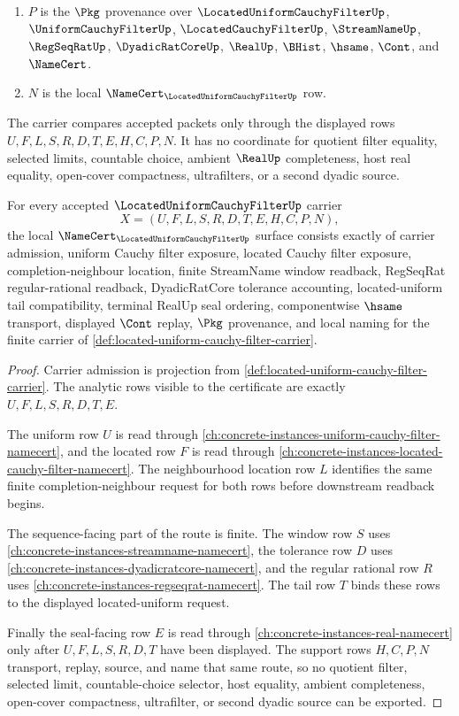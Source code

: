 \begin{definition}
\begin{enumerate}
\item $P$ is the $\Pkg$ provenance over $\LocatedUniformCauchyFilterUp$, $\UniformCauchyFilterUp$, $\LocatedCauchyFilterUp$, $\StreamNameUp$, $\RegSeqRatUp$, $\DyadicRatCoreUp$, $\RealUp$, $\BHist$, $\hsame$, $\Cont$, and $\NameCert$.
\item $N$ is the local $\NameCert_{\LocatedUniformCauchyFilterUp}$ row.
\end{enumerate}
The carrier compares accepted packets only through the displayed rows $U,F,L,S,R,D,T,E,H,C,P,N$. It has no coordinate for quotient filter equality, selected limits, countable choice, ambient $\RealUp$ completeness, host real equality, open-cover compactness, ultrafilters, or a second dyadic source.
\end{definition}

\begin{theorem}
\label{thm:located-uniform-cauchy-filter-obligations}
For every accepted $\LocatedUniformCauchyFilterUp$ carrier
$$
X=(U,F,L,S,R,D,T,E,H,C,P,N),
$$
the local $\NameCert_{\LocatedUniformCauchyFilterUp}$ surface consists exactly of carrier admission, uniform Cauchy filter exposure, located Cauchy filter exposure, completion-neighbour location, finite StreamName window readback, RegSeqRat regular-rational readback, DyadicRatCore tolerance accounting, located-uniform tail compatibility, terminal RealUp seal ordering, componentwise $\hsame$ transport, displayed $\Cont$ replay, $\Pkg$ provenance, and local naming for the finite carrier of \autoref{def:located-uniform-cauchy-filter-carrier}.
\end{theorem}
\begin{proof}
Carrier admission is projection from \autoref{def:located-uniform-cauchy-filter-carrier}. The analytic rows visible to the certificate are exactly $U,F,L,S,R,D,T,E$.

The uniform row $U$ is read through \autoref{ch:concrete-instances-uniform-cauchy-filter-namecert}, and the located row $F$ is read through \autoref{ch:concrete-instances-located-cauchy-filter-namecert}. The neighbourhood location row $L$ identifies the same finite completion-neighbour request for both rows before downstream readback begins.

The sequence-facing part of the route is finite. The window row $S$ uses \autoref{ch:concrete-instances-streamname-namecert}, the tolerance row $D$ uses \autoref{ch:concrete-instances-dyadicratcore-namecert}, and the regular rational row $R$ uses \autoref{ch:concrete-instances-regseqrat-namecert}. The tail row $T$ binds these rows to the displayed located-uniform request.

Finally the seal-facing row $E$ is read through \autoref{ch:concrete-instances-real-namecert} only after $U,F,L,S,R,D,T$ have been displayed. The support rows $H,C,P,N$ transport, replay, source, and name that same route, so no quotient filter, selected limit, countable-choice selector, host equality, ambient completeness, open-cover compactness, ultrafilter, or second dyadic source can be exported.
\end{proof}

